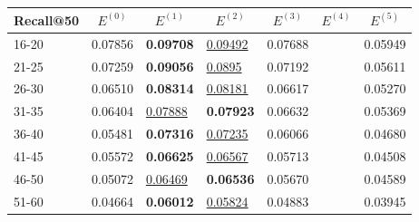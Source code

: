 \begin{table*}[]
    \centering
    \begin{tabular}{|l|l|l|l|l|l|l|}
        \hline
        Recall@50 & \multicolumn{1}{c|}{$E^{(0)}$} & \multicolumn{1}{c|}{$E^{(1)}$} & \multicolumn{1}{c|}{$E^{(2)}$} & \multicolumn{1}{c|}{$E^{(3)}$} & \multicolumn{1}{c|}{$E^{(4)}$} & \multicolumn{1}{c|}{$E^{(5)}$} \\ \hline
        16-20     & 0.07856                        & \textbf{0.09708}               & \underline{0.09492}            & 0.07688                        &                                & 0.05949                               \\ \hline
        21-25     & 0.07259                        & \textbf{0.09056}               & \underline{0.0895}             & 0.07192                        &                                & 0.05611                               \\ \hline
        26-30     & 0.06510                        & \textbf{0.08314}               & \underline{0.08181}            & 0.06617                        &                                & 0.05270                               \\ \hline
        31-35     & 0.06404                        & \underline{0.07888}            & \textbf{0.07923}               & 0.06632                        &                                & 0.05369                               \\ \hline
        36-40     & 0.05481                        & \textbf{0.07316}               & \underline{0.07235}            & 0.06066                        &                                & 0.04680                               \\ \hline
        41-45     & 0.05572                        & \textbf{0.06625}               & \underline{0.06567}            & 0.05713                        &                                & 0.04508                               \\ \hline
        46-50     & 0.05072                        & \underline{0.06469}            & \textbf{0.06536}               & 0.05670                        &                                & 0.04589                               \\ \hline
        51-60     & 0.04664                        & \textbf{0.06012}               & \underline{0.05824}            & 0.04883                        &                                & 0.03945                               \\ \hline

\end{tabular}
\end{table*}
